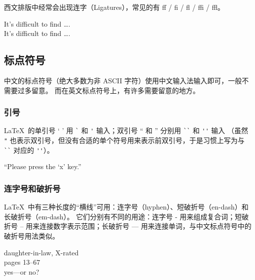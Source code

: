 西文排版中经常会出现连字（Ligatures），常见的有 ff / fi / fl / ffi / ffl{}。
\begin{example}
It's difficult to find \ldots .\\
It's dif{}f{}icult to f{}ind \ldots .
\end{example}

\subsection{标点符号}\label{subsec:punct}

中文的标点符号（绝大多数为非 ASCII 字符）使用中文输入法输入即可，一般不需要过多留意。
而在英文标点符号上，有许多需要留意的地方。

\subsubsection{引号}

\LaTeX\ 的单引号 ` ' 用 \texttt` 和 \texttt' 输入；双引号 `` 和 '' 分别用 \verb|``| 和 \verb|''| 输入
（虽然 \texttt" 也表示双引号，但没有合适的单个符号用来表示前双引号，于是习惯上写为与 \verb|``| 对应的 \verb|''|）。
\begin{example}
``Please press the `x' key.''
\end{example}

\subsubsection{连字号和破折号}

\LaTeX\ 中有三种长度的“横线”可用：连字号（hyphen）、短破折号（en-dash）和长破折号（em-dash）。
它们分别有不同的用途：连字号 - 用来组成复合词；短破折号 -- 用来连接数字表示范围；长破折号 --- 用来连接单词，与中文标点符号中的破折号用法类似。
\begin{example}
daughter-in-law, X-rated\\
pages 13--67\\
yes---or no?
\end{example}

